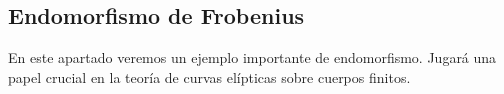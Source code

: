 %
%


\subsection{Endomorfismo de Frobenius}
\label{sub:Endomorfismo de Frobenius}

En este apartado veremos un ejemplo importante de endomorfismo. Jugará una papel crucial en la teoría de curvas elípticas sobre cuerpos finitos.

